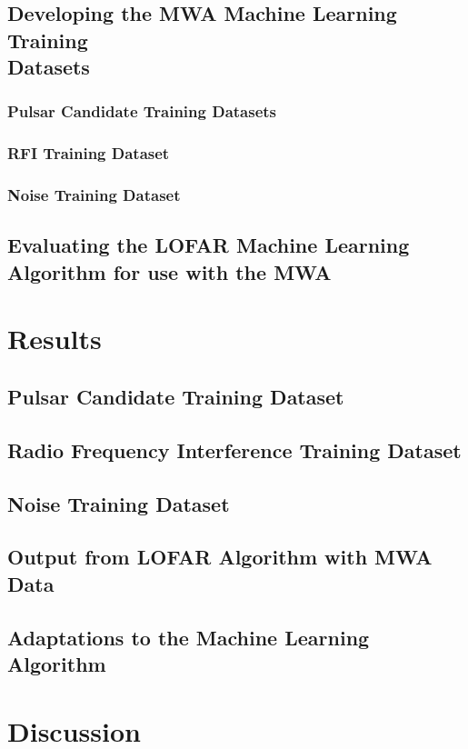 \documentclass{article}
\begin{document}
\subsection{Developing the MWA Machine Learning Training\\ Datasets}
\subsubsection{Pulsar Candidate Training Datasets}
\subsubsection{RFI Training Dataset}
\subsubsection{Noise Training Dataset}
\subsection{Evaluating the LOFAR Machine Learning Algorithm for use with the MWA}

\pagebreak
\section{Results}
\subsection{Pulsar Candidate Training Dataset}
\subsection{Radio Frequency Interference Training Dataset}
\subsection{Noise Training Dataset}
\subsection{Output from LOFAR Algorithm with MWA Data}
\subsection{Adaptations to the Machine Learning Algorithm}

\pagebreak
\section{Discussion}
\end{document}
